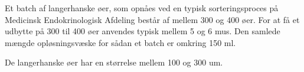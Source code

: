 Et batch af langerhanske øer, som opnåes ved en typisk sorteringsproces på Medicinsk Endokrinologisk Afdeling består af mellem 300 og 400 øer. For at få et udbytte på 300 til 400 øer anvendes typisk mellem 5 og 6 mus. Den samlede mængde opløsningsvæske for sådan et batch er omkring 150 ml.

De langerhanske øer har en størrelse mellem 100 og 300 um.





